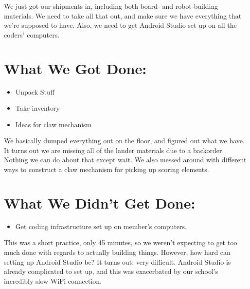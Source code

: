 \documentclass[12pt]{article}
\begin{document}
We just got our shipments in, including both board- and robot-building materials. We need to take all that out, and make sure we have everything that we're supposed to have. Also, we need to get Android Studio set up on all the coders' computers. 

\section{What We Got Done:} %
\begin{itemize}
	\item Unpack Stuff
	\item Take inventory
	\item Ideas for claw mechanism
\end{itemize}

We basically dumped everything out on the floor, and figured out what we have. It turns out we are missing all of the lander materials due to a backorder. Nothing we can do about that except wait. We also messed around with different ways to construct a claw mechanism for picking up scoring elements.

\section{What We Didn't Get Done:} %
\begin{itemize}
	\item Get coding infrastructure set up on member's computers.
\end{itemize}

This was a short practice, only 45 minutes, so we weren't expecting to get too much done with regards to actually building things. However, how hard can setting up Android Studio be? It turns out: very difficult. Android Studio is already complicated to set up, and this was exacerbated by our school's incredibly slow WiFi connection. 
\end{document}
